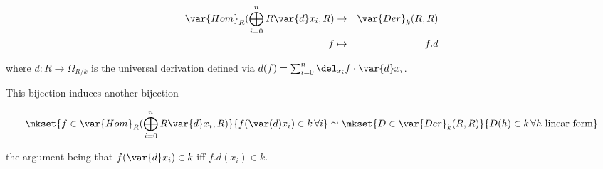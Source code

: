\begin{align}
\var{Hom}_R(\bigoplus_{i=0}^n R\var{d}x_i, R) & \to & \var{Der}_k(R,R)
\\
f & \mapsto & f . d
\end{align}

where $d : R \to \Omega_{R/k}$ is the universal derivation defined via $d(f) = \sum_{i=0}^n \del_{x_i}f \cdot\var{d}x_i$.


This bijection induces another bijection

\begin{equation}
\mkset{f \in \var{Hom}_R(\bigoplus_{i=0}^n R\var{d}x_i, R)}{ f(\var(d)x_i) \in k \,\forall i }
\simeq
\mkset{D \in \var{Der}_k(R,R)}{ D(h) \in k \,\forall h \text{ linear form}}
\end{equation}

the argument being that $f(\var{d}x_i) \in k$ iff $f.d(x_i) \in k$.





